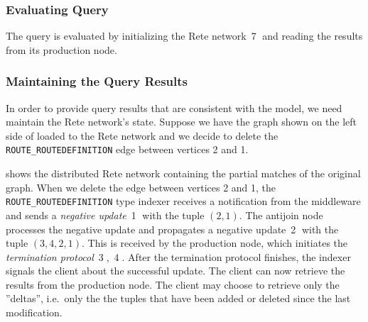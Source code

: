 \subsubsection{Evaluating Query}

The query is evaluated by initializing the Rete network~\textcircled{7} and reading the results from its production node.

\subsubsection{Maintaining the Query Results}

In order to provide query results that are consistent with the model, we need maintain the Rete network's state. Suppose we have the graph shown on the left side of  loaded to the Rete network and we decide to delete the \texttt{ROUTE\_ROUTEDEFINITION} edge between vertices 2 and 1.


 shows the distributed Rete network containing the partial matches of the original graph. When we delete the edge between vertices 2 and 1, the \texttt{ROUTE\_ROUTEDEFINITION} type indexer receives a notification from the middleware and sends a \textit{negative update}~\textcircled{1} with the tuple $(2, 1)$. The antijoin node processes the negative update and propagates a negative update~\textcircled{2} with the tuple $(3, 4, 2, 1)$. This is received by the production node, which initiates the \textit{termination protocol}~\textcircled{3},~\textcircled{4}. After the termination protocol finishes, the indexer signals the client about the successful update. The client can now retrieve the results from the production node. The client may choose to retrieve only the ''deltas'', i.e.\ only the the tuples that have been added or deleted since the last modification.



